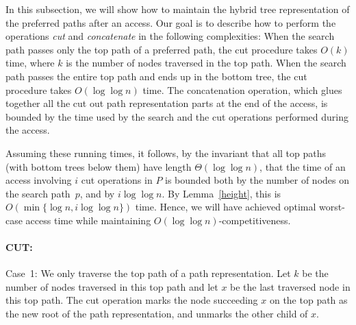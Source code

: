 \documentclass[letterpaper,11pt]{article}
\newcommand{\toppath}{top path}
\newcommand{\bottomtree}{bottom tree}
\begin{document}
In this subsection, we will show how to maintain the hybrid tree
representation of the preferred paths after an access. Our goal is to
describe how to perform the operations \emph{cut} and \emph{concatenate} in
the following complexities: When the search path passes only the \toppath{}
of a preferred path, the cut procedure takes $O(k)$ time, where $k$ is the
number of nodes traversed in the \toppath{}. When the search path passes
the entire \toppath{} and ends up in the \bottomtree{}, the cut procedure
takes $O(\log \log n )$ time.  The concatenation operation, which glues
together all the cut out path representation parts at the end of the
access, is bounded by the time used by the search and the cut operations
performed during the access.

Assuming these running times, it follows, by the invariant that all
\toppath{}s (with \bottomtree{}s below them) have length $\Theta(\log\log
n)$, that the time of an access involving $i$ cut operations in $P$ is
bounded both by the number of nodes on the search path~$p$, and by $i \log
\log n$. By Lemma~\ref{height}, this is $O(\min\{\log n, i \log \log n\})$
time. Hence, we will have achieved optimal worst-case access time while
maintaining $O(\log \log n)$-competitiveness.

\paragraph{CUT:} Case~1: We only traverse the \toppath{} of a path
representation. Let $k$ be the number of nodes traversed in this \toppath{}
and let $x$ be the last traversed node in this \toppath{}. The cut
operation marks the node succeeding $x$ on the \toppath{} as the new root of the
path representation, and unmarks the other child of $x$.
\end{document}
